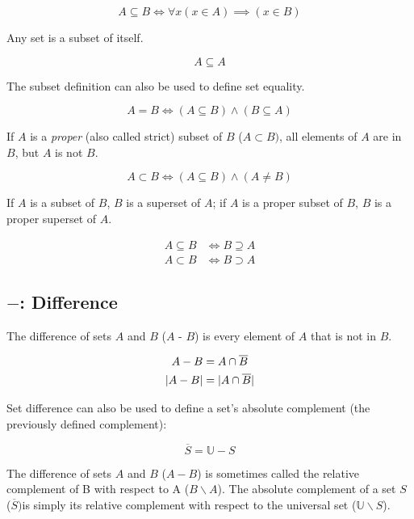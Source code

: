 \documentclass{report}
\DeclarePairedDelimiter{\card}{\lvert}{\rvert}
\newcommand{\universal}{\mathbb{U}}
\begin{document}
\begin{equation}
    A \subseteq B \iff \forall x (x \in A) \implies (x \in B)
\end{equation}

Any set is a subset of itself.

\begin{equation}
    A \subseteq A
\end{equation}

The subset definition can also be used to define set equality.

\begin{equation}
    A = B \iff (A \subseteq B) \land (B \subseteq A)
\end{equation}

If $A$ is a \emph{proper} (also called strict) subset of $B$ ($A \subset B)$,
all elements of $A$ are in $B$, but $A$ is not $B$.

\begin{equation}
    A \subset B \iff (A \subseteq B) \land (A  \not= B)
\end{equation}

If $A$ is a subset of $B$, $B$ is a superset of $A$; if $A$ is a proper subset of $B$, $B$ is a proper superset of $A$.

\begin{align}
    A \subseteq B &\iff B \supseteq A \\
    A \subset B &\iff B \supset A
\end{align}

\subsection{$-$: Difference}

The difference of sets $A$ and $B$ ($A$ - $B$) is every element of $A$ that is not in $B$.

\begin{align}
    A - B &= A \cap \overline{B} \\
    \card{A - B} &= \card{A \cap \overline{B}}
\end{align}

Set difference can also be used to define a set's absolute complement (the previously defined complement):

\begin{equation}
    \overline{S} = \universal - S
\end{equation}

The difference of sets $A$ and $B$ ($A - B$) is sometimes called the relative complement of B with respect to A ($B \backslash A$). The absolute complement of a set $S$  ($\overline{S}) $is simply its relative complement with respect to the universal set ($\universal \backslash {S}$).
\end{document}
